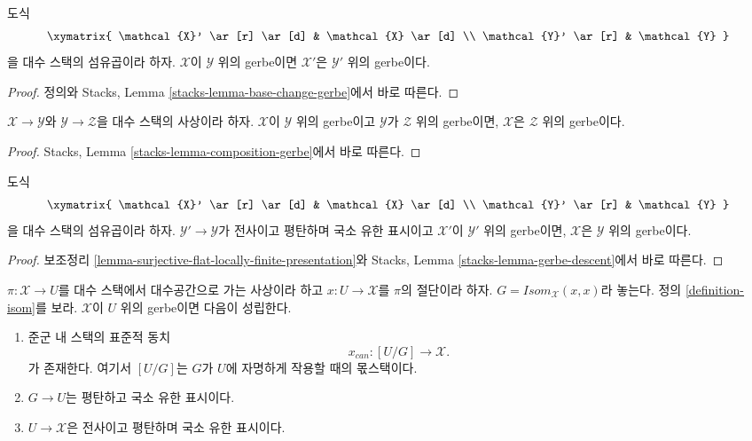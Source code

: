 \begin{lemma}
\label{lemma-base-change-gerbe}
도식
$$
\xymatrix{
\mathcal{X}' \ar[r] \ar[d] & \mathcal{X} \ar[d] \\
\mathcal{Y}' \ar[r] & \mathcal{Y}
}
$$
을 대수 스택의 섬유곱이라 하자. $\mathcal{X}$이 $\mathcal{Y}$ 위의
gerbe이면 $\mathcal{X}'$은 $\mathcal{Y}'$ 위의 gerbe이다.
\end{lemma}

\begin{proof}
정의와 Stacks, Lemma \ref{stacks-lemma-base-change-gerbe}에서 바로 따른다.
\end{proof}

\begin{lemma}
\label{lemma-composition-gerbe}
$\mathcal{X} \to \mathcal{Y}$와 $\mathcal{Y} \to \mathcal{Z}$을 대수
스택의 사상이라 하자. $\mathcal{X}$이 $\mathcal{Y}$ 위의 gerbe이고
$\mathcal{Y}$가 $\mathcal{Z}$ 위의 gerbe이면, $\mathcal{X}$은
$\mathcal{Z}$ 위의 gerbe이다.
\end{lemma}

\begin{proof}
Stacks, Lemma \ref{stacks-lemma-composition-gerbe}에서 바로 따른다.
\end{proof}

\begin{lemma}
\label{lemma-gerbe-descent}
도식
$$
\xymatrix{
\mathcal{X}' \ar[r] \ar[d] & \mathcal{X} \ar[d] \\
\mathcal{Y}' \ar[r] & \mathcal{Y}
}
$$
을 대수 스택의 섬유곱이라 하자. $\mathcal{Y}' \to \mathcal{Y}$가
전사이고 평탄하며 국소 유한 표시이고 $\mathcal{X}'$이
$\mathcal{Y}'$ 위의 gerbe이면, $\mathcal{X}$은 $\mathcal{Y}$ 위의
gerbe이다.
\end{lemma}

\begin{proof}
보조정리 \ref{lemma-surjective-flat-locally-finite-presentation}와
Stacks, Lemma \ref{stacks-lemma-gerbe-descent}에서 바로 따른다.
\end{proof}

\begin{lemma}
\label{lemma-gerbe-with-section}
$\pi : \mathcal{X} \to U$를 대수 스택에서 대수공간으로 가는 사상이라
하고 $x : U \to \mathcal{X}$를 $\pi$의 절단이라 하자.
$G = \mathit{Isom}_\mathcal{X}(x, x)$라 놓는다. 정의
\ref{definition-isom}를 보라. $\mathcal{X}$이 $U$ 위의 gerbe이면 다음이
성립한다.
\begin{enumerate}
\item 준군 내 스택의 표준적 동치
$$
x_{can} : [U/G] \longrightarrow \mathcal{X}.
$$
가 존재한다. 여기서 $[U/G]$는 $G$가 $U$에 자명하게 작용할 때의
몫스택이다.
\item $G \to U$는 평탄하고 국소 유한 표시이다.
\item $U \to \mathcal{X}$은 전사이고 평탄하며 국소 유한 표시이다.
\end{enumerate}
\end{lemma}

